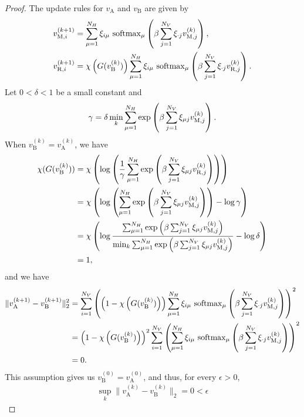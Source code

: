 \begin{proof}
The update rules for $v_{\mathrm{A}}$ and $v_{\mathrm{B}}$ are given by
\begin{align}
v^{(k+1)}_{\mathrm{M},i}
&=
\sum_{\mu=1}^{N_{H}}
\xi_{i\mu}
~\mathrm{softmax}_{\mu}
\left(
\beta \sum_{j=1}^{N_{V}} 
\xi_{\cdot j} v^{(k)}_{\mathrm{M},j}
\right),\\
v^{(k+1)}_{\mathrm{R},i}
&=
\chi
\left(
G(v^{(k)}_{\mathrm{B}})
\right)
\sum_{\mu=1}^{N_{H}}
\xi_{i\mu}
~\mathrm{softmax}_{\mu}
\left(
\beta \sum_{j=1}^{N_{V}} 
\xi_{\cdot j} v^{(k)}_{\mathrm{R},j}
\right).
\end{align}
Let $0 < \delta < 1$ be a small constant and
\begin{align}
\gamma = \delta \min_{k} \sum_{\mu = 1}^{N_{H}}
\exp\left({\beta \sum_{j=1}^{N_{V}} \xi_{\mu j} v^{(k)}_{\mathrm{M},j}}\right).
\end{align}
When $v^{(k)}_{\mathrm{B}} = v^{(k)}_{\mathrm{A}}$, we have
\begin{align}
\chi(G(v^{(k)}_{\mathrm{B}}))
&=
\chi
\left(
\log
\left(
\frac{1}{\gamma}
\sum_{\mu = 1}^{N_{H}}
\exp\left({\beta \sum_{j=1}^{N_{V}} \xi_{\mu j} v^{(k)}_{\mathrm{R},j}}\right)
\right)
\right)\\
&=
\chi
\left(
\log
\left(
\sum_{\mu = 1}^{N_{H}}
\exp\left({\beta \sum_{j=1}^{N_{V}} \xi_{\mu j} v^{(k)}_{\mathrm{M},j}}\right)
\right)
- \log{\gamma}
\right)\\
&= \chi
\left(
\log
\frac{
\sum_{\mu = 1}^{N_{H}}
\exp\left({\beta \sum_{j=1}^{N_{V}} \xi_{\mu j} v^{(k)}_{\mathrm{M},j}}\right)
}{
\min_{k} \sum_{\mu = 1}^{N_{H}}
\exp\left({\beta \sum_{j=1}^{N_{V}} \xi_{\mu j} v^{(k)}_{\mathrm{M},j}}\right)
}
- \log \delta\right)\\
&= 1
,
\end{align}
and we have
\begin{align}
\|v_{\mathrm{A}}^{(k+1)} - v_{\mathrm{B}}^{(k+1)}\|^{2}_{2}
&=
\sum_{i=1}^{N_{V}}
\left(
\left( 1 - \chi
\left(
G(v^{(k)}_{\mathrm{B}})
\right)
\right)
\sum_{\mu=1}^{N_{H}}
\xi_{i\mu}
~\mathrm{softmax}_{\mu}
\left(
\beta \sum_{j=1}^{N_{V}} 
\xi_{\cdot j} v^{(k)}_{\mathrm{M},j}
\right)
\right)^{2}\\
&=
\left( 1 - \chi
\left(
G(v^{(k)}_{\mathrm{B}})
\right)
\right)^{2}
\sum_{i=1}^{N_{V}}
\left(
\sum_{\mu=1}^{N_{H}}
\xi_{i\mu}
~\mathrm{softmax}_{\mu}
\left(
\beta \sum_{j=1}^{N_{V}} 
\xi_{\cdot j} v^{(k)}_{\mathrm{M},j}
\right)
\right)^{2}\\
&= 0.
\end{align}
This assumption gives us $v^{(0)}_{\mathrm{B}} = v^{(0)}_{\mathrm{A}}$, and thus, for every $\epsilon > 0$,
\begin{align}
\sup_{k} \|v_{\mathrm{A}}^{(k)} - v_{\mathrm{B}}^{(k)}\|_{2} = 0< \epsilon
\end{align}
\end{proof}

